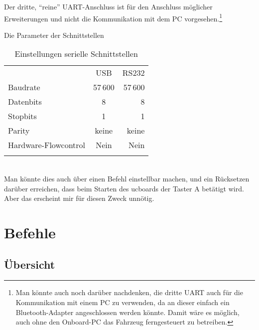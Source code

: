 Der dritte, "`reine"' UART-Anschluss ist für den Anschluss möglicher Erweiterungen und nicht die Kommunikation mit dem PC vorgesehen.\footnote{Man könnte auch noch darüber nachdenken, die dritte UART auch für die Kommunikation mit einem PC zu verwenden, da an dieser einfach ein Bluetooth-Adapter angeschlossen werden könnte. Damit wäre es möglich, auch ohne den Onboard-PC das Fahrzeug ferngesteuert zu betreiben.}


Die Parameter der Schnittstellen

\begin{table}%
	\centering
	\caption{Einstellungen serielle Schnittstellen}
	\label{tab:Comm:UARTParam}
	\begin{tabular}{lcr}
			\mytoprule
			 & USB & RS232 \\
			\mymidrule
			Baudrate & 57\,600 & 57\,600 \\
			Datenbits & 8 & 8 \\
			Stopbits & 1 & 1 \\
			Parity & keine & keine \\
			Hardware-Flowcontrol & Nein & Nein \\
			\mybottomrule
	\end{tabular}\\
	\color[rgb]{1,0,0}{ToDo: Testen, welche Baudrate jeweils maximal möglich ist!} \textcolor[rgb]{0.75,0.75,0.75}{\footnotesize{Man könnte dies auch über einen Befehl einstellbar machen, und ein Rücksetzen darüber erreichen, dass beim Starten des ucboards \zB der Taster A betätigt wird. Aber das erscheint mir für diesen Zweck unnötig.}}
\end{table}


\section{Befehle}

\subsection{Übersicht}

